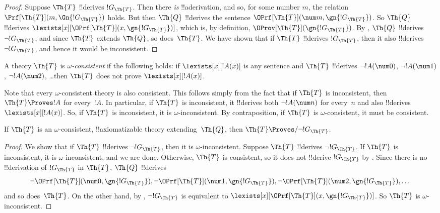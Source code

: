 \documentclass[../../../include/open-logic-section]{subfiles}
\begin{document}
\begin{proof}
Suppose $\Th{T}$ !!{derive}s $!G_\Th{T}$. Then there \emph{is}
!!a{derivation}, and so, for some number $m$, the relation $\Prf[\Th{T}](m,
\Gn{!G_\Th{T}})$ holds. But then $\Th{Q}$ !!{derive}s the sentence
$\OPrf[\Th{T}](\num m, \gn{!G_\Th{T}})$. So $\Th{Q}$ !!{derive}s
$\lexists[x][\OPrf[\Th{T}](x,\gn{!G_\Th{T}})]$, which is, by definition,
$\OProv[\Th{T}](\gn{!G_\Th{T}})$. By , $\Th{Q}$ !!{derive}s
$\lnot !G_\Th{T}$, and since $\Th{T}$ extends $\Th{Q}$, so
does~$\Th{T}$. We have shown that if $\Th{T}$ !!{derive}s $!G_\Th{T}$, then
it also !!{derive}s $\lnot !G_\Th{T}$, and hence it would be inconsistent.
\end{proof}

\begin{defn}
A theory $\Th{T}$ is \emph{$\omega$-consistent} if the following holds: if
$\lexists[x][!A(x)]$ is any sentence and $\Th{T}$ !!{derive}s $\lnot
!A(\num 0)$, $\lnot !A(\num 1)$, $\lnot !A(\num 2)$, \dots then $\Th{T}$
does not prove $\lexists[x][!A(x)]$.
\end{defn}

Note that every $\omega$-consistent theory is also consistent. This
follows simply from the fact that if $\Th{T}$ is inconsistent, then
$\Th{T} \Proves !A$ for every~$!A$. In particular, if $\Th{T}$ is
inconsistent, it !!{derive}s both $\lnot !A(\num n)$ for every~$n$ and
also !!{derive}s~$\lexists[x][!A(x)]$. So, if $\Th{T}$ is
inconsistent, it is $\omega$-inconsistent. By contraposition, if
$\Th{T}$ is $\omega$-consistent, it must be consistent.

\begin{lem}
If $\Th{T}$ is an $\omega$-consistent, !!{axiomatizable} theory
extending~$\Th{Q}$, then $\Th{T} \Proves/ \lnot !G_\Th{T}$.
\end{lem}

\begin{proof}
We show that if $\Th{T}$ !!{derive}s $\lnot !G_\Th{T}$, then it is
$\omega$-inconsistent. Suppose $\Th{T}$ !!{derive}s $\lnot !G_\Th{T}$. If
$\Th{T}$ is inconsistent, it is $\omega$-inconsistent, and we are
done. Otherwise, $\Th{T}$ is consistent, so it does not !!{derive}
$!G_\Th{T}$ by . Since there is no
!!{derivation} of $!G_\Th{T}$ in $\Th{T}$, $\Th{Q}$ !!{derive}s
\[
\lnot \OPrf[\Th{T}](\num 0, \gn{!G_\Th{T}}), \lnot \OPrf[\Th{T}](\num 1,
\gn{!G_\Th{T}}), \lnot \OPrf[\Th{T}](\num 2, \gn{!G_\Th{T}}), \dots
\]
and so does~$\Th{T}$.  On the other hand, by , $\lnot
!G_\Th{T}$ is equivalent to
$\lexists[x][\OPrf[\Th{T}](x,\gn{!G_\Th{T}})]$. So $\Th{T}$ is
$\omega$-inconsistent.
\end{proof}
\end{document}
